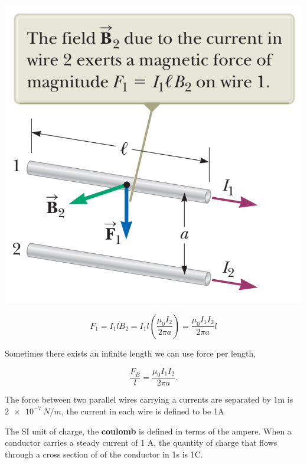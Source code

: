 \documentclass[12pt, titlepage, oneside]{article}
\renewcommand{\b}[1]{\textbf{#1}}
\begin{document}
\begin{center}
	\includegraphics[scale=0.4]{5.png}
\end{center}
\begin{equation}
F_1 = I_1 l B_2 = I_1 l \left( \frac{\mu_0 I_2}{2\pi a} \right) = \frac{\mu_0 I_1 I_2}{2\pi a} l
\end{equation}

Sometimes there exists an infinite length we can use force per length,

\begin{equation}
\frac{F_B}{l} = \frac{\mu_0 I_1 I_2}{2\pi a}.
\end{equation}

The force between two parallel wires carrying a currents are separated by 1m is $\SI{2e-7}{N/m}$, the current in each wire is defined to be 1A 


The SI unit of charge, the \b{coulomb} is defined in terms of the ampere. When a conductor carries a steady current of 1 A, the quantity of charge that flows through a cross section of of the conductor in 1s is 1C.
\end{document}
